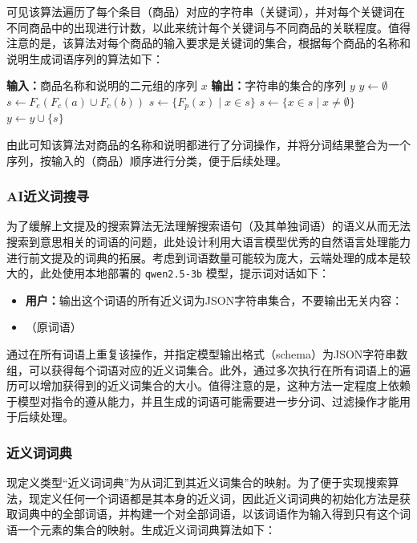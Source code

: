 可见该算法遍历了每个条目（商品）对应的字符串（关键词），并对每个关键词在不同商品中的出现进行计数，以此来统计每个关键词与不同商品的关联程度。值得注意的是，该算法对每个商品的输入要求是关键词的集合，根据每个商品的名称和说明生成词语序列的算法如下：

\vspace{1em}
\begin{algorithmic}
	\STATE \textbf{输入：}商品名称和说明的二元组的序列 $x$
	\STATE \textbf{输出：}字符串的集合的序列 $y$
	\STATE $y \gets \emptyset$
		\STATE $s \gets F_e(F_c(a) \cup F_c(b))$
		\STATE $s \gets \{F_p(x) \mid x \in s\}$
		\STATE $s \gets \{x \in s \mid x \neq \emptyset\}$
		\STATE $y \gets y \cup \{s\}$
	\ENDFOR
\end{algorithmic}
\vspace{1em}

由此可知该算法对商品的名称和说明都进行了分词操作，并将分词结果整合为一个序列，按输入的（商品）顺序进行分类，便于后续处理。

\subsubsection{AI近义词搜寻}

为了缓解上文提及的搜索算法无法理解搜索语句（及其单独词语）的语义从而无法搜索到意思相关的词语的问题，此处设计利用大语言模型优秀的自然语言处理能力进行前文提及的词典的拓展。考虑到词语数量可能较为庞大，云端处理的成本是较大的，此处使用本地部署的 \verb|qwen2.5-3b| 模型，提示词对话如下：

\begin{itemize}
	\item[] \textbf{用户：}输出这个词语的所有近义词为JSON字符串集合，不要输出无关内容：
	\item[]（原词语）
\end{itemize}

通过在所有词语上重复该操作，并指定模型输出格式（schema）为JSON字符串数组，可以获得每个词语对应的近义词集合。此外，通过多次执行在所有词语上的遍历可以增加获得到的近义词集合的大小。值得注意的是，这种方法一定程度上依赖于模型对指令的遵从能力，并且生成的词语可能需要进一步分词、过滤操作才能用于后续处理。

\subsubsection{近义词词典}

现定义类型“近义词词典”为从词汇到其近义词集合的映射。为了便于实现搜索算法，现定义任何一个词语都是其本身的近义词，因此近义词词典的初始化方法是获取词典中的全部词语，并构建一个对全部词语，以该词语作为输入得到只有这个词语一个元素的集合的映射。生成近义词词典算法如下：

